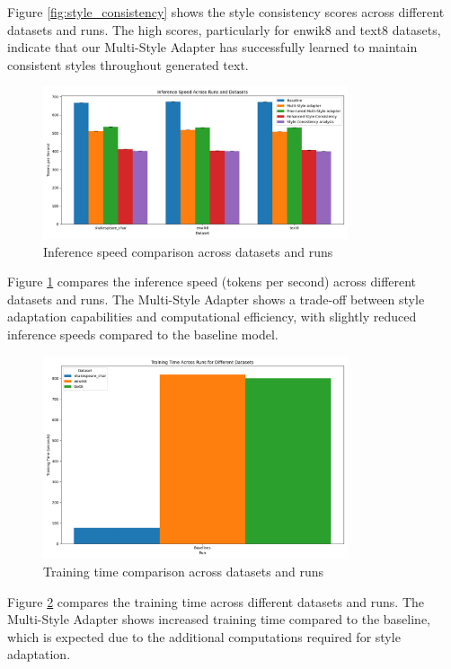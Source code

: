 \documentclass{article} %
\begin{document}
Figure \ref{fig:style_consistency} shows the style consistency scores across different datasets and runs. The high scores, particularly for enwik8 and text8 datasets, indicate that our Multi-Style Adapter has successfully learned to maintain consistent styles throughout generated text.

\begin{figure}[h]
    \centering
    \includegraphics[width=0.8\textwidth]{inference_speed.png}
    \caption{Inference speed comparison across datasets and runs}
    \label{fig:inference_speed}
\end{figure}

Figure \ref{fig:inference_speed} compares the inference speed (tokens per second) across different datasets and runs. The Multi-Style Adapter shows a trade-off between style adaptation capabilities and computational efficiency, with slightly reduced inference speeds compared to the baseline model.

\begin{figure}[h]
    \centering
    \includegraphics[width=0.8\textwidth]{train_time_grouped.png}
    \caption{Training time comparison across datasets and runs}
    \label{fig:train_time}
\end{figure}

Figure \ref{fig:train_time} compares the training time across different datasets and runs. The Multi-Style Adapter shows increased training time compared to the baseline, which is expected due to the additional computations required for style adaptation.
\end{document}
